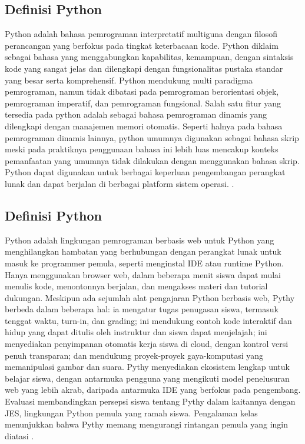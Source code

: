 \subsection{Definisi Python}
Python adalah bahasa pemrograman interpretatif multiguna dengan filosofi perancangan yang berfokus pada tingkat keterbacaan kode. Python diklaim sebagai bahasa yang menggabungkan kapabilitas, kemampuan, dengan sintaksis kode yang sangat jelas dan dilengkapi dengan fungsionalitas pustaka standar yang besar serta komprehensif. Python mendukung multi paradigma pemrograman, namun tidak dibatasi pada pemrograman berorientasi objek, pemrograman imperatif, dan pemrograman fungsional. Salah satu fitur yang tersedia pada python adalah sebagai bahasa  
pemrograman dinamis yang dilengkapi dengan manajemen memori otomatis. Seperti halnya pada bahasa pemrograman dinamis lainnya, python umumnya digunakan sebagai bahasa skrip meski pada praktiknya penggunaan bahasa ini lebih luas mencakup konteks pemanfaatan yang umumnya tidak dilakukan dengan menggunakan bahasa skrip. Python dapat digunakan untuk berbagai keperluan pengembangan perangkat lunak dan dapat berjalan di berbagai platform sistem operasi. \cite{rosmalasarana}.

\subsection{Definisi Python}
Python adalah lingkungan pemrograman berbasis web untuk Python yang menghilangkan hambatan yang berhubungan dengan perangkat lunak untuk masuk ke programmer pemula, seperti menginstal IDE atau runtime Python. Hanya menggunakan browser web, dalam beberapa menit siswa dapat mulai menulis kode, menontonnya berjalan, dan mengakses materi dan tutorial dukungan. Meskipun ada sejumlah alat pengajaran Python berbasis web, Pythy berbeda dalam beberapa hal: ia mengatur tugas penugasan siswa, termasuk tenggat waktu, turn-in, dan grading; ini mendukung contoh kode interaktif dan hidup yang dapat ditulis oleh instruktur dan siswa dapat menjelajah; ini menyediakan penyimpanan otomatis kerja siswa di cloud, dengan kontrol versi penuh transparan; dan mendukung proyek-proyek gaya-komputasi yang memanipulasi gambar dan suara. Pythy menyediakan ekosistem lengkap untuk belajar siswa, dengan antarmuka pengguna yang mengikuti model penelusuran web yang lebih akrab, daripada antarmuka IDE yang berfokus pada pengembang. Evaluasi membandingkan persepsi siswa tentang Pythy dalam kaitannya dengan JES, lingkungan Python pemula yang ramah siswa. Pengalaman kelas menunjukkan bahwa Pythy memang mengurangi rintangan pemula yang ingin diatasi \cite{edwards2014pythy}.

